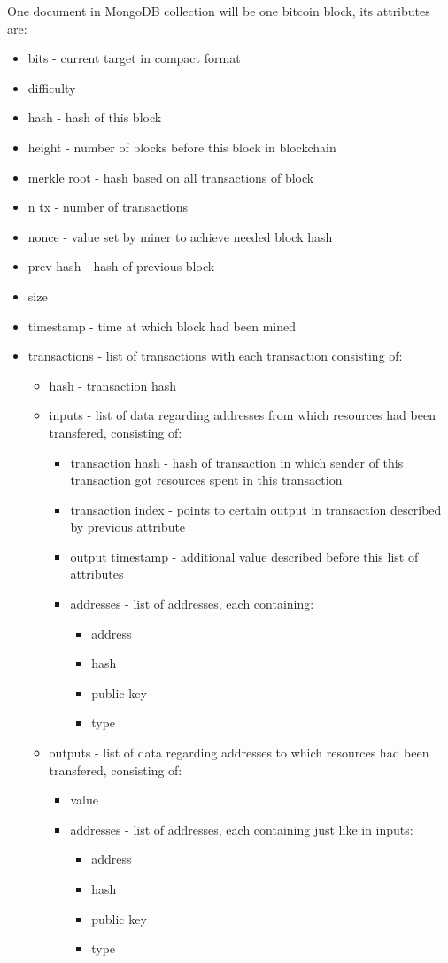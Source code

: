 \documentclass[12pt, en, eng, oneside]{mgr}
\begin{document}
One document in MongoDB collection will be one bitcoin block, its attributes are:
\begin{itemize}
\item
bits - current target in compact format \cite{bitcoin-wiki-bha}
\item
difficulty
\item
hash - hash of this block
\item
height - number of blocks before this block in blockchain
\item
merkle root - hash based on all transactions of block
\item
n tx - number of transactions
\item
nonce - value set by miner to achieve needed block hash
\item
prev hash - hash of previous block
\item
size
\item
timestamp - time at which block had been mined
\item
transactions - list of transactions with each transaction consisting of:
\begin{itemize}
\item
hash - transaction hash
\item
inputs - list of data regarding addresses from which resources had been transfered, consisting of:
\begin{itemize}
\item
transaction hash - hash of transaction in which sender of this transaction got resources spent in this transaction
\item
transaction index - points to certain output in transaction described by previous attribute
\item
output timestamp - additional value described before this list of attributes
\item addresses - list of addresses, each containing:
\begin{itemize}
\item
address
\item
hash
\item
public key
\item
type
\end{itemize}
\end{itemize}	
\item
outputs - list of data regarding addresses to which resources had been transfered, consisting of:	
\begin{itemize}
\item
value
\item addresses - list of addresses, each containing just like in inputs:
\begin{itemize}
\item
address
\item
hash
\item
public key
\item
type
\end{itemize}
\end{itemize} 	
\end{itemize}
\end{itemize}
\end{document}
